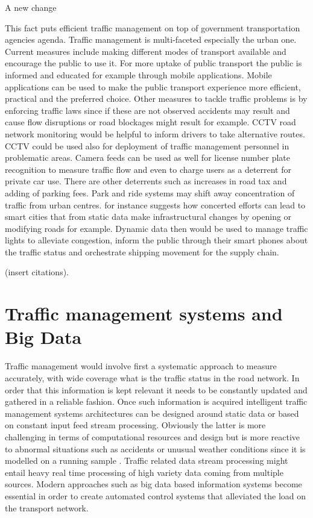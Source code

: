 \documentclass[12pt, a4paper]{report}
\theoremstyle{definition}
\theoremstyle{definition}%
\theoremstyle{definition}%
\theoremstyle{definition}%
\theoremstyle{definition}%
\theoremstyle{definition}%
\begin{document}
A new change

This fact puts efficient traffic management on top of government transportation agencies agenda.
Traffic management is multi-faceted especially the urban one. Current measures include making different modes of transport available and encourage the public to use it. For more uptake of public transport the public is informed and educated for example through mobile applications.  Mobile applications can be used to make the public transport experience more efficient, practical and the preferred choice. Other measures to tackle traffic problems is by enforcing traffic laws since if these are not observed accidents may result and cause flow disruptions or road blockages might result for example. CCTV road network monitoring would be helpful to inform drivers to take alternative routes. CCTV could be used also for deployment of traffic management personnel in problematic areas. Camera feeds can be used as well for license number plate recognition to measure traffic flow and even to charge users as a deterrent for private car use. There are other deterrents such as increases in road tax and adding of parking fees. Park and ride systems may shift away concentration of traffic from urban centres.  \cite{AlNuaimi2015} for instance suggests how concerted efforts can lead to smart cities that from static data make infrastructural changes by opening or modifying roads for example. Dynamic data  then would be used to manage traffic lights to alleviate congestion, inform the public through their smart phones about the traffic status and orchestrate shipping movement for the supply chain.

(insert citations). 


\section{Traffic management systems and Big Data}

Traffic management would involve first a systematic approach to measure accurately, with wide coverage what is the traffic status in the road network. In order that this information is kept relevant it needs to be constantly updated and gathered in a reliable fashion. Once such information is acquired intelligent traffic management systems architectures can be designed around static data or based  on constant input feed stream processing. Obviously the latter is more challenging in terms of computational resources and design but is more reactive to abnormal situations such as accidents or unusual weather conditions since it is modelled on a running sample \cite{Toole2015}. Traffic related data stream processing might entail heavy real time processing of high variety data coming from multiple sources. Modern approaches such as big data based information systems become essential in order to create automated control systems that alleviated the load on the transport network.
\end{document}

